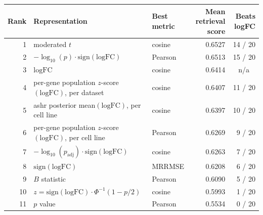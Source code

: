 \begin{table}[t]
\label{tab:cross_dataset_retrieval_representation_ranking_all}
\centering
\footnotesize
\setlength{\tabcolsep}{6pt}
\begin{tabular}{rllrr}
\toprule
Rank & Representation & Best metric & Mean retrieval score & Beats logFC \\
\midrule
1 & moderated $t$ & cosine & 0.6527 & 14 / 20 \\
2 & $-\log_{10}(p)\cdot\mathrm{sign}(\mathrm{logFC})$ & Pearson & 0.6513 & 15 / 20 \\
3 & $\mathrm{logFC}$ & cosine & 0.6414 & \multicolumn{1}{c}{n/a} \\
4 & per-gene population $z$-score$(\mathrm{logFC})$, per dataset & cosine & 0.6407 & 11 / 20 \\
5 & ashr posterior mean$(\mathrm{logFC})$, per cell line & cosine & 0.6397 & 10 / 20 \\
6 & per-gene population $z$-score$(\mathrm{logFC})$, per cell line & Pearson & 0.6269 & 9 / 20 \\
7 & $-\log_{10}(p_{\mathrm{adj}})\cdot\mathrm{sign}(\mathrm{logFC})$ & cosine & 0.6263 & 7 / 20 \\
8 & $\mathrm{sign}(\mathrm{logFC})$ & MRRMSE & 0.6208 & 6 / 20 \\
9 & $B$ statistic & Pearson & 0.6090 & 5 / 20 \\
10 & $z=\mathrm{sign}(\mathrm{logFC})\cdot\Phi^{-1}(1-p/2)$ & cosine & 0.5993 & 1 / 20 \\
11 & $p$ value & Pearson & 0.5534 & 0 / 20 \\
\bottomrule
\end{tabular}
\end{table}
